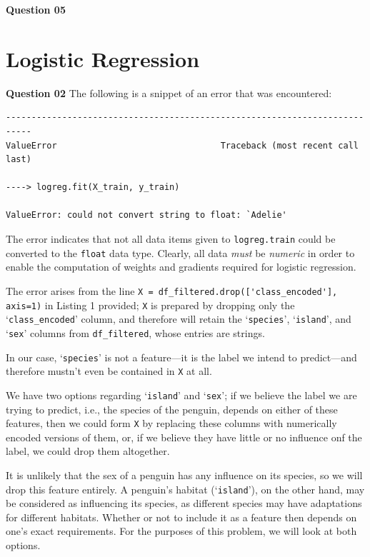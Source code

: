\documentclass{article}[a4paper]
\begin{document}
	\textbf{Question 05}
	\medskip

	\section{Logistic Regression}

	\textbf{Question 02} The following is a snippet of an error that was encountered:
	\begin{verbatim}
---------------------------------------------------------------------------
ValueError                                Traceback (most recent call last)

----> logreg.fit(X_train, y_train)

ValueError: could not convert string to float: `Adelie'\end{verbatim}

	The error indicates that not all data items given to \texttt{logreg.train} could be converted to the \texttt{float} data type. Clearly, all data \textit{must} be \textit{numeric} in order to enable the computation of weights and gradients required for logistic regression.

	The error arises from the line \lstinline|X = df_filtered.drop(['class_encoded'], axis=1)| in Listing 1 provided; \texttt{X} is prepared by dropping only the `\texttt{class\_encoded}' column, and therefore will retain the `\texttt{species}', `\texttt{island}', and `\texttt{sex}' columns from \texttt{df\_filtered}, whose entries are strings.

	In our case, `\texttt{species}' is not a feature---it is the label we intend to predict---and therefore mustn't even be contained in \texttt{X} at all.
	
	We have two options regarding `\texttt{island}' and `\texttt{sex}'; if we  believe the label we are trying to predict, i.e., the species of the penguin, depends on either of these features, then we could form \texttt{X} by replacing these columns with numerically encoded versions of them, or, if we believe they have little or no influence onf the label, we could drop them altogether.

	It is unlikely that the sex of a penguin has any influence on its species, so we will drop this feature entirely. A penguin's habitat (`\texttt{island}'), on the other hand, may be considered as influencing its species, as different species may have adaptations for different habitats. Whether or not to include it as a feature then depends on one's exact requirements. For the purposes of this problem, we will look at both options.
	
\end{document}
